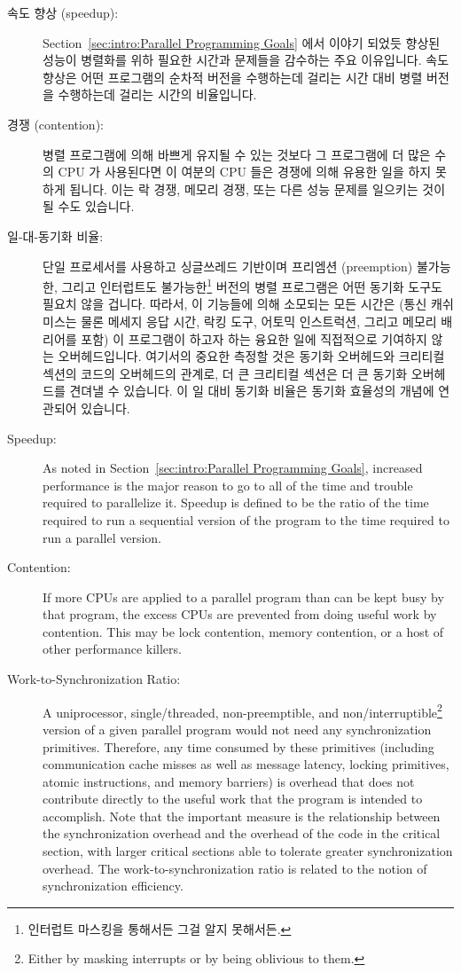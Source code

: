 \begin{description}
\item[속도 향상 (speedup):]  Section~\ref{sec:intro:Parallel Programming Goals}
	에서 이야기 되었듯 향상된 성능이 병렬화를 위하 필요한 시간과 문제들을
	감수하는 주요 이유입니다.
	속도 향상은 어떤 프로그램의 순차적 버전을 수행하는데 걸리는 시간 대비
	병렬 버전을 수행하는데 걸리는 시간의 비율입니다.
\item[경쟁 (contention):]  병렬 프로그램에 의해 바쁘게 유지될 수 있는 것보다 그
	프로그램에 더 많은 수의 CPU 가 사용된다면 이 여분의 CPU 들은 경쟁에
	의해 유용한 일을 하지 못하게 됩니다.
	이는 락 경쟁, 메모리 경쟁, 또는 다른 성능 문제를 일으키는 것이 될 수도
	있습니다.
\item[일-대-동기화 비율:]  단일 프로세서를 사용하고 싱글쓰레드 기반이며
	프리엠션 (preemption) 불가능한, 그리고 인터럽트도 불가능한\footnote{
		인터럽트 마스킹을 통해서든 그걸 알지 못해서든.}
	버전의 병렬 프로그램은 어떤 동기화 도구도 필요치 않을 겁니다.
	따라서, 이 기능들에 의해 소모되는 모든 시간은 (통신 캐쉬 미스는 물론
	메세지 응답 시간, 락킹 도구, 어토믹 인스트럭션, 그리고 메모리 배리어를
	포함) 이 프로그램이 하고자 하는 융요한 일에 직접적으로 기여하지 않는
	오버헤드입니다.
	여기서의 중요한 측정할 것은 동기화 오버헤드와 크리티컬 섹션의 코드의
	오버헤드의 관계로, 더 큰 크리티컬 섹션은 더 큰 동기화 오버헤드를 견뎌낼
	수 있습니다.
	이 일 대비 동기화 비율은 동기화 효율성의 개념에 연관되어 있습니다.

\iffalse

\item[Speedup:]  As noted in
	Section~\ref{sec:intro:Parallel Programming Goals},
	increased performance is the major reason
	to go to all of the time and trouble
	required to parallelize it.
	Speedup is defined to be the ratio of the time required
	to run a sequential version of the program to the time
	required to run a parallel version.
\item[Contention:]  If more CPUs are applied to a parallel
	program than can be kept busy by that program,
	the excess CPUs are prevented from doing
	useful work by contention.
	This may be lock contention, memory contention, or a host
	of other performance killers.
\item[Work-to-Synchronization Ratio:]  A uniprocessor,
	single\-/threaded, non-preemptible, and non\-/interruptible\footnote{
		Either by masking interrupts or by being oblivious to them.}
	version of a given parallel
	program would not need any synchronization primitives.
	Therefore, any time consumed by these primitives
	(including communication cache misses as well as
	message latency, locking primitives, atomic instructions,
	and memory barriers)
	is overhead that does not contribute directly to the useful
	work that the program is intended to accomplish.
	Note that the important measure is the
	relationship between the synchronization overhead
	and the overhead of the code in the critical section, with larger
	critical sections able to tolerate greater synchronization overhead.
	The work-to-synchronization ratio is related to
	the notion of synchronization efficiency.


\end{description}
